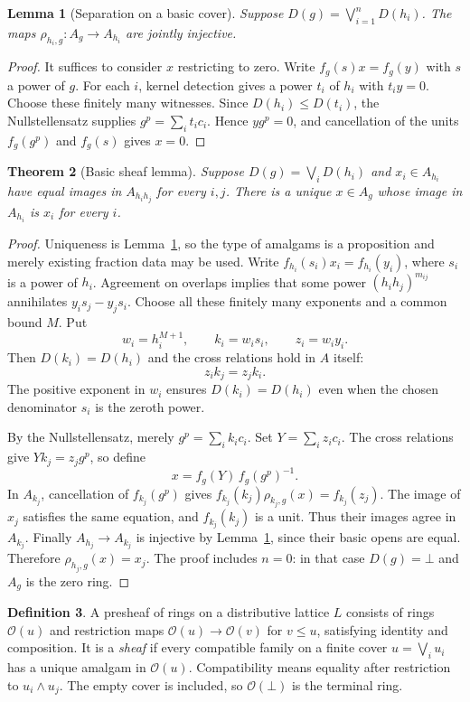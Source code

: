 \documentclass[11pt]{amsart}
\newtheorem{theorem}{Theorem}[section]
\newtheorem{lemma}[theorem]{Lemma}
\theoremstyle{definition}
\newtheorem{definition}[theorem]{Definition}
\theoremstyle{remark}
\newcommand{\OO}{\mathcal O}
\begin{document}
\begin{lemma}[Separation on a basic cover]\label{lem:sep}
Suppose $D(g)=\bigvee_{i=1}^nD(h_i)$. The maps
$\rho_{h_i,g}:A_g\to A_{h_i}$ are jointly injective.
\end{lemma}
\begin{proof}
It suffices to consider $x$ restricting to zero. Write $f_g(s)x=f_g(y)$
with $s$ a power of $g$. For each $i$, kernel detection gives a power
$t_i$ of $h_i$ with $t_iy=0$. Choose these finitely many witnesses.
Since $D(h_i)\leq D(t_i)$, the Nullstellensatz supplies
$g^p=\sum_i t_ic_i$. Hence $yg^p=0$, and cancellation of the units
$f_g(g^p)$ and $f_g(s)$ gives $x=0$.
\end{proof}

\begin{theorem}[Basic sheaf lemma]\label{thm:basic-sheaf}
Suppose $D(g)=\bigvee_iD(h_i)$ and $x_i\in A_{h_i}$ have equal images
in $A_{h_ih_j}$ for every $i,j$. There is a unique $x\in A_g$ whose
image in $A_{h_i}$ is $x_i$ for every $i$.
\end{theorem}
\begin{proof}
Uniqueness is Lemma~\ref{lem:sep}, so the type of amalgams is a
proposition and merely existing fraction data may be used.
Write $f_{h_i}(s_i)x_i=f_{h_i}(y_i)$, where $s_i$ is a power of $h_i$.
Agreement on overlaps implies that some power $(h_ih_j)^{m_{ij}}$
annihilates $y_is_j-y_js_i$. Choose all these finitely many exponents
and a common bound $M$. Put
\[
 w_i=h_i^{M+1},\qquad k_i=w_is_i,\qquad z_i=w_iy_i.
\]
Then $D(k_i)=D(h_i)$ and the cross relations hold in $A$ itself:
\[
 z_ik_j=z_jk_i.
\]
The positive exponent in $w_i$ ensures $D(k_i)=D(h_i)$ even when the
chosen denominator $s_i$ is the zeroth power.

By the Nullstellensatz, merely $g^p=\sum_i k_ic_i$. Set
$Y=\sum_i z_ic_i$. The cross relations give $Yk_j=z_jg^p$, so define
\[
 x=f_g(Y)\,f_g(g^p)^{-1}.
\]
In $A_{k_j}$, cancellation of $f_{k_j}(g^p)$ gives
$f_{k_j}(k_j)\rho_{k_j,g}(x)=f_{k_j}(z_j)$.
The image of $x_j$ satisfies the same equation, and $f_{k_j}(k_j)$ is a
unit. Thus their images agree in $A_{k_j}$. Finally
$A_{h_j}\to A_{k_j}$ is injective by Lemma~\ref{lem:sep}, since their
basic opens are equal. Therefore $\rho_{h_j,g}(x)=x_j$.
The proof includes $n=0$: in that case $D(g)=\bot$ and $A_g$ is the
zero ring.
\end{proof}

\begin{definition}
A presheaf of rings on a distributive lattice $L$ consists of rings
$\OO(u)$ and restriction maps $\OO(u)\to\OO(v)$ for $v\leq u$,
satisfying identity and composition. It is a \emph{sheaf} if every
compatible family on a finite cover $u=\bigvee_i u_i$ has a unique
amalgam in $\OO(u)$. Compatibility means equality after restriction to
$u_i\wedge u_j$. The empty cover is included, so $\OO(\bot)$ is the
terminal ring.
\end{definition}
\end{document}
